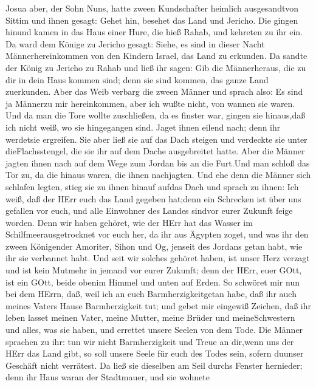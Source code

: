  Josua aber, der Sohn Nuns, hatte zween Kundschafter
heimlich ausgesandtvon Sittim und ihnen gesagt: Gehet hin, besehet das
Land und Jericho. Die gingen hinund kamen in das Haus einer Hure, die
hieß Rahab, und kehreten zu ihr ein.  Da ward dem Könige zu
Jericho gesagt: Siehe, es sind in dieser Nacht Männerhereinkommen von
den Kindern Israel, das Land zu erkunden.  Da sandte der
König zu Jericho zu Rahab und ließ ihr sagen: Gib die Männerheraus, die
zu dir in dein Haus kommen sind; denn sie sind kommen, das ganze Land
zuerkunden.  Aber das Weib verbarg die zween Männer und
sprach also: Es sind ja Männerzu mir hereinkommen, aber ich wußte nicht,
von wannen sie waren.  Und da man die Tore wollte
zuschließen, da es finster war, gingen sie hinaus,daß ich nicht weiß, wo
sie hingegangen sind. Jaget ihnen eilend nach; denn ihr werdetsie
ergreifen.  Sie aber ließ sie auf das Dach steigen und
verdeckte sie unter dieFlachsstengel, die sie ihr auf dem Dache
ausgebreitet hatte.  Aber die Männer jagten ihnen nach auf
dem Wege zum Jordan bis an die Furt.Und man schloß das Tor zu, da die
hinaus waren, die ihnen nachjagten.  Und ehe denn die Männer
sich schlafen legten, stieg sie zu ihnen hinauf aufdas Dach 
und sprach zu ihnen: Ich weiß, daß der HErr euch das Land gegeben
hat;denn ein Schrecken ist über uns gefallen vor euch, und alle
Einwohner des Landes sindvor eurer Zukunft feige worden. 
Denn wir haben gehöret, wie der HErr hat das Wasser im
Schilfmeerausgetrocknet vor euch her, da ihr aus Ägypten zoget, und was
ihr den zween Königender Amoriter, Sihon und Og, jenseit des Jordans
getan habt, wie ihr sie verbannet habt.  Und seit wir
solches gehöret haben, ist unser Herz verzagt und ist kein Mutmehr in
jemand vor eurer Zukunft; denn der HErr, euer GOtt, ist ein GOtt, beide
obenim Himmel und unten auf Erden.  So schwöret mir nun bei
dem HErrn, daß, weil ich an euch Barmherzigkeitgetan habe, daß ihr auch
meines Vaters Hause Barmherzigkeit tut; und gebet mir eingewiß Zeichen,
 daß ihr leben lasset meinen Vater, meine Mutter, meine
Brüder und meineSchwestern und alles, was sie haben, und errettet unsere
Seelen von dem Tode.  Die Männer sprachen zu ihr: tun wir
nicht Barmherzigkeit und Treue an dir,wenn uns der HErr das Land gibt,
so soll unsere Seele für euch des Todes sein, sofern duunser Geschäft
nicht verrätest.  Da ließ sie dieselben am Seil durchs
Fenster hernieder; denn ihr Haus waran der Stadtmauer, und sie wohnete
